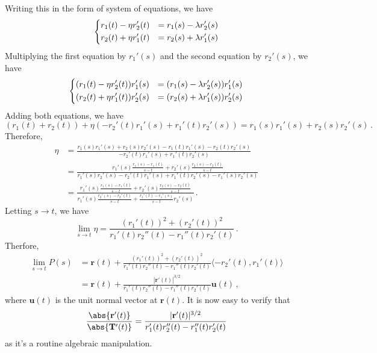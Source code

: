 \documentclass[12pt]{amsart}
\newcommand{\vect}{\mathbf}
\begin{document}
     Writing this in the form of system of equations, we have
     \begin{equation*}
         \begin{dcases}
         r_1(t) - \eta r_2'(t) &= r_1(s) - \lambda r_2'(s) \\
         r_2(t) + \eta r_1'(t) &= r_2(s) + \lambda r_1'(s) 
         \end{dcases}
     \end{equation*}
     Multiplying the first equation by $r_1'(s)$ and the second equation by $r_2'(s)$, we have
     \begin{equation*}
         \begin{dcases}
             (r_1(t) - \eta r_2'(t))r_1'(s) &= (r_1(s) - \lambda r_2'(s))r_1'(s) \\
             (r_2(t) + \eta r_1'(t))r_2'(s) &= (r_2(s) + \lambda r_1'(s))r_2'(s) 
         \end{dcases}
     \end{equation*}
     Adding both equations, we have
     \begin{equation*}
         (r_1(t) + r_2(t)) + \eta (-r_2'(t) r_1'(s) + r_1'(t) r_2'(s)) = r_1(s)r_1'(s) + r_2(s)r_2'(s) \,.
     \end{equation*}
     Therefore,
     \begin{align*}
         \eta &= \frac{ r_1(s)r_1'(s) + r_2(s)r_2'(s) - r_1(t)r_1'(s) - r_2(t)r_2'(s)}{-r_2'(t) r_1'(s) + r_1'(t) r_2'(s)}\\
              &= \frac{ r_1'(s) \frac{r_1(s) - r_1(t)}{s-t} + r_2'(s) \frac{r_2(s) - r_2(t)}{s-t}}{ r_1'(s)r_2'(s) - r_2'(t) r_1'(s) + r_1'(t) r_2'(s) - r_1'(s) r_2'(s)} \\
              &= \frac{ r_1'(s) \frac{r_1(s) - r_1(t)}{s-t} + r_2'(s) \frac{r_2(s) - r_2(t)}{s-t}}{ r_1'(s)\frac{r_2'(s) - r_2'(t)}{s-t}  + \frac{r_1'(t)  - r_1'(s)}{s-t} r_2'(s)}  \,.
     \end{align*}
     Letting $s\to t$, we have
     \begin{equation*}
         \lim_{s\to t} \eta = \frac{(r_1'(t))^2  + (r_2'(t))^2}{ r_1'(t) r_2''(t) - r_1''(t)r_2'(t)} \,.
     \end{equation*}
     Therfore,
     \begin{align*}
         \lim_{s\to t} P(s) &= \vect{r}(t) + \frac{(r_1'(t))^2  + (r_2'(t))^2}{ r_1'(t) r_2''(t) - r_1''(t)r_2'(t)} \langle -r_2'(t), r_1'(t) \rangle \\
                            &= \vect{r}(t) + \frac{ | \vect{r}'(t) |^{3/2} }{ r_1'(t) r_2''(t) - r_1''(t)r_2'(t)} \vect{u}(t) \,,
     \end{align*}
     where $ \vect{u}(t)$ is the unit normal vector at $\vect{r}(t)$.
     It is now easy to verify that
     \begin{equation*}
         \frac{\abs{ \vect{r}'(t)}}{\abs{\vect{T}'(t)}}= \frac{ | \vect{r}'(t) |^{3/2} }{ r_1'(t) r_2''(t) - r_1''(t)r_2'(t)} 
     \end{equation*}
     as it's a routine algebraic manipulation.
\end{document}
